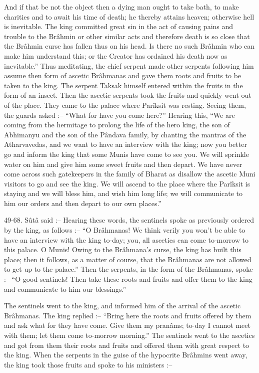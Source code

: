 And if that be not the object then a dying man ought to take bath, to make charities and to await his time of death; he thereby attains heaven; otherwise hell is inevitable. The king committed great sin in the act of causing pains and trouble to the Br\^ahmin or other similar acts and therefore death is so close that the Br\^ahmin curse has fallen thus on his head. Is there no such Br\^ahmin who can make him understand this; or the Creator has ordained his death now as inevitable.'' Thus meditating, the chief serpent made other serpents following him assume then form of ascetic Br\^ahmanas and gave them roots and fruits to be taken to the king. The serpent Taksak himself entered within the fruits in the form of an insect. Then the ascetic serpents took the fruits and quickly went out of the place. They came to the palace where Par\^iksit was resting. Seeing them, the guards asked :-- ``What for have you come here?'' Hearing this, ``We are coming from the hermitage to prolong the life of the hero king, the son of Abhimanyu and the son of the P\^andava family, by chanting the mantras of the Atharvavedas, and we want to have an interview with the king; now you better go and inform the king that some Munis have come to see you. We will sprinkle water on him and give him some sweet fruits and then depart. We have never come across such gatekeepers in the family of Bharat as disallow the ascetic Muni visitors to go and see the king. We will ascend to the place where the Par\^iksit is staying and we will bless him, and wish him long life; we will communicate to him our orders and then depart to our own places.''

49-68. S\^ut\^a said :-- Hearing these words, the sentinels spoke as previously ordered by the king, as follows :-- ``O Br\^ahmanas! We think verily you won't be able to have an interview with the king to-day; you, all ascetics can come to-morrow to this palace. O Munis! Owing to the Br\^ahmana's curse, the king has built this place; then it follows, as a matter of course, that the Br\^ahmanas are not allowed to get up to the palace.'' Then the serpents, in the form of the Br\^ahmanas, spoke :-- ``O good sentinels! Then take these roots and fruits and offer them to the king and communicate to him our blessings.''

The sentinels went to the king, and informed him of the arrival of the ascetic Br\^ahmanas. The king replied :-- ``Bring here the roots and fruits offered by them and ask what for they have come. Give them my pran\^ams; to-day I cannot meet with them; let them come to-morrow morning.'' The sentinels went to the ascetics and got from them their roots and fruits and offered them with great respect to the king. When the serpents in the guise of the hypocrite Br\^ahmins went away, the king took those fruits and spoke to his ministers :--

